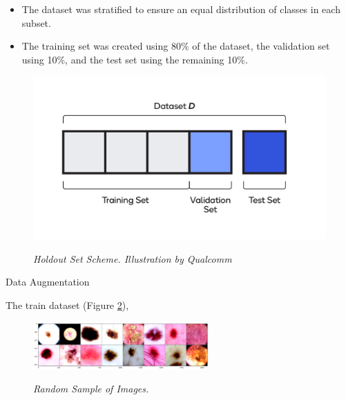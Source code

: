 \documentclass[dvipsnames,mathserif]{beamer}
\begin{document}
{\begin{frame}
      \footnotesize

      \begin{itemize}
        \item The dataset was stratified to ensure an equal distribution of classes in each subset.
        \item The training set was created using 80\% of the dataset, the validation set using 10\%, and the test set using the remaining 10\%.
      \end{itemize}


      \begin{figure}[H]
        \centering
        \begin{adjustbox}{width=0.5\textwidth, trim={0cm 0.5cm 0cm 0.5cm}, clip}
          \includegraphics[width=\textwidth]{images/train-test-validation-sets.png}
        \end{adjustbox}
        \caption[Holdout Set Scheme]{\textit{Holdout Set Scheme. Illustration by Qualcomm}}
        {\label{fig:holdout-test-scheme}}
      \end{figure}

    \end{frame}

    \begin{frame}

      \large Data Augmentation
      \vspace{0.25cm}

      \footnotesize

      The train dataset (Figure \ref{fig:sample-of-datasets}),

      \begin{figure}[H]
        \centering
        \includegraphics[width=0.6\textwidth]{images/random-sample-of-isic.png}
        \caption[Random Sample of Images]{\footnotesize{\textit{Random Sample of Images.}}}
        {\label{fig:sample-of-datasets}}
      \end{figure}


\end{frame}}
\end{document}
